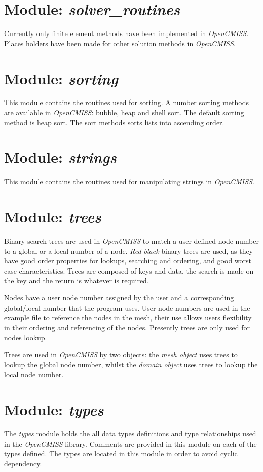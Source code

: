 \section{Module: \emph{solver\_routines}}
\label{sec:solverroutines}

Currently only finite element methods have been implemented in \emph{OpenCMISS}. 
Places holders have been made for other solution methods in \emph{OpenCMISS}.


\section{Module: \emph{sorting}}
\label{sec:sorting}

This module contains the routines used for sorting. A number sorting methods 
are available in \emph{OpenCMISS}: bubble, heap and shell sort. The default 
sorting method is heap sort. The sort methods sorts lists into ascending order. 


\section{Module: \emph{strings}}
\label{sec:strings}

This module contains the routines used for manipulating strings in 
\emph{OpenCMISS}.


\section{Module: \emph{trees}}
\label{sec:trees}

Binary search trees are used in \emph{OpenCMISS} to match a user-defined node 
number to a global or a local number of a node. \emph{Red-black} binary trees 
are used, as they have good order properties for lookups, searching and 
ordering, and good worst case characteristics. Trees are composed of keys and 
data, the search is made on the key and the return is whatever is required.

Nodes have a user node number assigned by the user and a corresponding 
global/local number that the program uses. User node numbers are used in the 
example file to reference the nodes in the mesh, their use allows users 
flexibility in their ordering and referencing of the nodes. Presently trees 
are only used for nodes lookup.

Trees are used in \emph{OpenCMISS} by two objects: the \emph{mesh object} uses 
trees to lookup the global node number, whilst the \emph{domain object} uses
trees to lookup the local node number.


\section{Module: \emph{types}}
\label{sec:types}

The \emph{types} module holds the all data types definitions and type
relationships used in the \emph{OpenCMISS} library. Comments are provided 
in this module on each of the types defined. The types are located in this 
module in order to avoid cyclic dependency. 